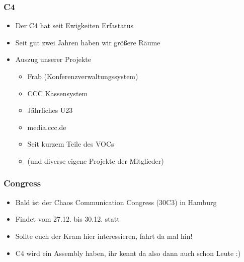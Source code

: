 \documentclass[ngerman,compress]{beamer}
\begin{document}
\begin{frame}
	\frametitle{C4}
	\begin{itemize}
		\item Der C4 hat seit Ewigkeiten Erfastatus
		\item Seit gut zwei Jahren haben wir größere Räume
		\item Auszug unserer Projekte
		\begin{itemize}
			\item Frab (Konferenzverwaltungssystem)
			\item CCC Kassensystem
			\item Jährliches U23
			\item media.ccc.de
			\item Seit kurzem Teile des VOCs
			\item (und diverse eigene Projekte der Mitglieder)
		\end{itemize}
	\end{itemize}
\end{frame}


\begin{frame}
	\frametitle{Congress}
	\begin{itemize}
		\item Bald ist der Chaos Communication Congress (30C3) in Hamburg
		\item Findet vom 27.12. bis 30.12. statt
		\item Sollte euch der Kram hier interessieren, fahrt da mal hin!
		\item C4 wird ein Assembly haben, ihr kennt da also dann auch schon Leute :)
	\end{itemize}
\end{frame}
\end{document}
